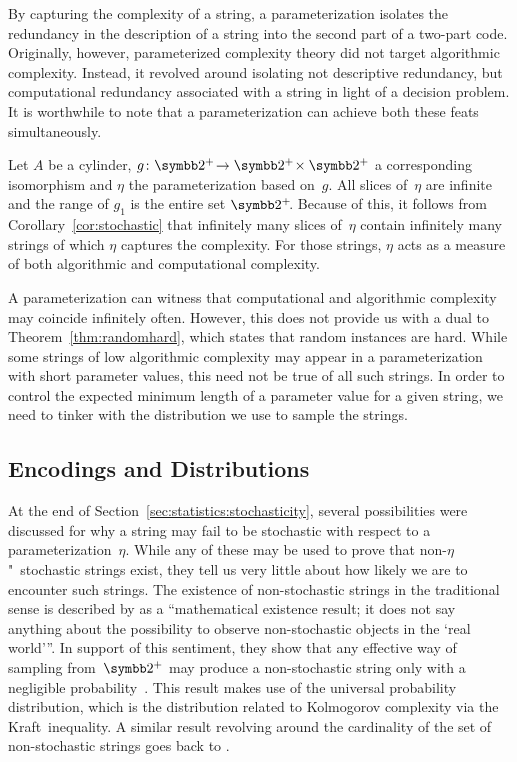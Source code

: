 \begin{example}
\label{ex:simultaneous}%
  By capturing the complexity of a string, a parameterization isolates the redundancy in the description of a string into the second part of a two-part code.
  Originally, however, parameterized complexity theory did not target algorithmic complexity.
  Instead, it revolved around isolating not descriptive redundancy, but computational redundancy associated with a string in light of a decision problem.
  It is worthwhile to note that a parameterization can achieve both these feats simultaneously.

  Let $A$ be a \pdash{}cylinder, $g\colon \binary^+\! \to \binary^+\! \times \binary^+$ a corresponding isomorphism and $\eta$ the parameterization based on~$g$.
  All slices of~$\eta$ are infinite and the range of $g_1$ is the entire set $\binary^+\!$.
  Because of this, it follows from Corollary~\ref{cor:stochastic} that infinitely many slices of~$\eta$ contain infinitely many strings of which $\eta$ captures the complexity.
  For those strings, $\eta$ acts as a measure of both algorithmic and computational complexity.
\end{example}

A parameterization can witness that computational and algorithmic complexity may coincide infinitely often.
However, this does not provide us with a dual to Theorem~\ref{thm:randomhard}, which states that random instances are hard.
While some strings of low algorithmic complexity may appear in a parameterization with short parameter values, this need not be true of all such strings.
In order to control the expected minimum length of a parameter value for a given string, we need to tinker with the distribution we use to sample the strings.

\subsection{Encodings and Distributions}
\label{sec:statistics:encodings_distributions}%
At the end of Section~\ref{sec:statistics:stochasticity}, several possibilities were discussed for why a string may fail to be stochastic with respect to a parameterization~$\eta$.
While any of these may be used to prove that non-$\eta$"~stochastic strings exist, they tell us very little about how likely we are to encounter such strings.
The existence of non-stochastic strings in the traditional sense is described by \citeauthor{vereshchagin2017algorithmic} as a \enquote{mathematical existence result; it does not say anything about the possibility to observe non-stochastic objects in the \enquote{real world}}.
In support of this sentiment, they show that any effective way of sampling from~$\binary^+$ may produce a non-stochastic string only with a negligible probability~\parencite{muchnik1998mathematical,vereshchagin2017algorithmic}.
This result makes use of the universal probability distribution, which is the distribution related to Kolmogorov complexity via the Kraft~inequality.
A similar result revolving around the cardinality of the set of non-stochastic strings goes back to \textcite[Theorem~3]{shen1983concept}.

